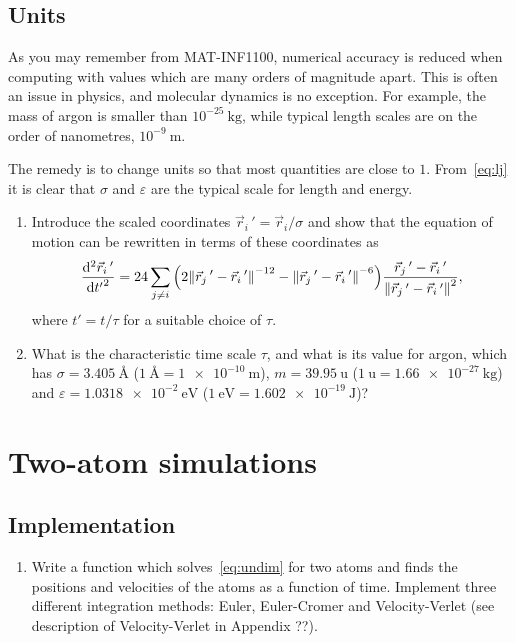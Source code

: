 \documentclass[11pt,british,a4paper]{report}
\begin{document}
\subsection{Units}
As you may remember from MAT-INF1100, numerical accuracy is reduced when computing with values which are many orders of magnitude apart. This is often an issue in physics, and molecular dynamics is no exception. For example, the mass of argon is smaller than \(10^{-25}\ \si{\kg}\), while typical length scales are on the order of nanometres, \(10^{-9}\ \si{\m}\).

The remedy is to change units so that most quantities are close to \(1\). From~\vref{eq:lj} it is clear that \(\sigma\) and \(\varepsilon\) are the typical scale for length and energy.

\begin{enumerate}[label=\roman*.]
    \item Introduce the scaled coordinates \(\vec{r}_i\,'=\vec{r}_i/\sigma\) and show that the equation of motion can be rewritten in terms of these coordinates as
    \begin{equation}
        \dv[2]{\vec{r}_i\,'}{{t'}} = 24 \sum_{j \neq i} \qty(2\norm{\vec{r}_j\,'-\vec{r}_i\,'}^{-12}-\norm{\vec{r}_j\,'-\vec{r}_i\,'}^{-6})\frac{\vec{r}_j\,'-\vec{r}_i\,'}{\norm{\vec{r}_j\,'-\vec{r}_i\,'}^2},\label{eq:undim}
    \end{equation}
    where \(t'=t/\tau\) for a suitable choice of \(\tau\).
    \item What is the characteristic time scale \(\tau\), and what is its value for argon, which has \(\sigma=\SI{3.405}{\angstrom}\) (\(\SI{1}{\angstrom}=\SI{1e-10}{\m}\)), \(m = \SI{39.95}{\atomicmassunit}\) (\(\SI{1}{\atomicmassunit} = \SI{1.66e-27}{\kg}\)) and \(\varepsilon=\SI{1.0318e-2}{\eV}\) (\(\SI{1}{\eV}=\SI{1.602e-19}{\J}\))?
\end{enumerate}



\section{Two-atom simulations}

\subsection{Implementation}
\begin{enumerate}[label=\roman*.]
    \item Write a function which solves~\vref{eq:undim} for two atoms and finds the positions and velocities of the atoms as a function of time. Implement three different integration methods:
    Euler, Euler-Cromer and Velocity-Verlet (see description of Velocity-Verlet in Appendix ??).
\end{enumerate}
\end{document}
